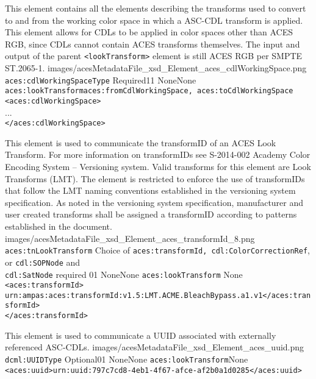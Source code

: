         {This element contains all the elements describing the transforms used to convert to and from the working color space in which a ASC-CDL transform is applied. This element allows for CDLs to be applied in color spaces other than ACES RGB, since CDLs cannot contain ACES transforms themselves. The input and output of the parent \texttt{<lookTransform>} element is still ACES RGB per SMPTE ST.2065-1. }
        {images/acesMetadataFile_xsd_Element_aces_cdlWorkingSpace.png}
        {\texttt{aces:cdlWorkingSpaceType}}
        {Required}{1}{1}
        {None}{None}
        {\texttt{aces:lookTransform}}{\texttt{aces:fromCdlWorkingSpace, aces:toCdlWorkingSpace}}
        {\lstinline{<aces:cdlWorkingSpace>} \\
        ... \\
        \lstinline{</aces:cdlWorkingSpace>}}

        {This element is used to communicate the transformID of an ACES Look Transform.  For more information on transformIDs see S-2014-002 Academy Color Encoding System -- Versioning system.  Valid transforms for this element are Look Transforms (LMT).  The element is restricted to enforce the use of transformIDs that follow the LMT naming conventions established in the versioning system specification.  As noted in the versioning system specification, manufacturer and user created transforms shall be assigned a transformID according to patterns established in the document.}
        {images/acesMetadataFile_xsd_Element_aces_transformId_8.png}
        {\texttt{aces:tnLookTransform}}
        {Choice of \texttt{aces:transformId, cdl:ColorCorrectionRef}, or \texttt{cdl:SOPNode} and \\ \texttt{cdl:SatNode} required}
        {0}{1}
        {None}{None}
        {\texttt{aces:lookTransform}}
        {None}
        {\lstinline{<aces:transformId>}\\
        \lstinline{urn:ampas:aces:transformId:v1.5:LMT.ACME.BleachBypass.a1.v1</aces:transformId>}\\
        \lstinline{</aces:transformId>}
        }

		{This element is used to communicate a UUID associated with externally referenced ASC-CDLs.}
		{images/acesMetadataFile_xsd_Element_aces_uuid.png}
		{\texttt{dcml:UUIDType}}
		{Optional}{0}{1}
		{None}{None}
		{\texttt{aces:lookTransform}}{None}
		{\lstinline{<aces:uuid>urn:uuid:797c7cd8-4eb1-4f67-afce-af2b0a1d0285</aces:uuid>}}


